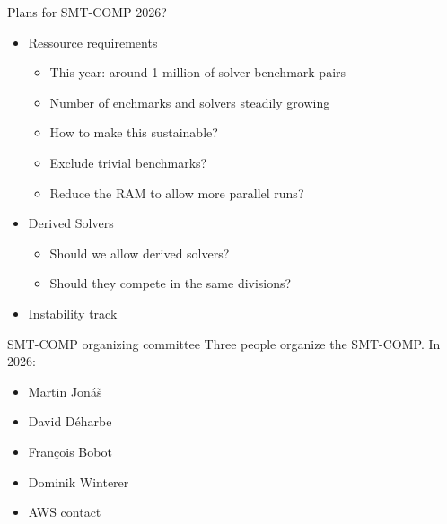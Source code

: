 \documentclass[table]{beamer}
\def\emph#1{\textcolor{MYblue}{#1}}
\newcommand\vitem{\vfill\item}
\begin{document}
\begin{frame}{Plans for SMT-COMP 2026?}
  \begin{itemize}
    \item Ressource requirements 
        \begin{itemize}
            \item This year: around 1 million of solver-benchmark pairs 
            \item Number of enchmarks and solvers steadily growing 
            \item How to make this sustainable? 
            \item Exclude \emph{trivial benchmarks}?
            \item Reduce the RAM to allow more parallel runs?
        \end{itemize} 
    \item Derived Solvers
        \begin{itemize}
            \item Should we allow derived solvers?
            \item Should they compete in the same divisions?
        \end{itemize}
    \item Instability track 


  \end{itemize}


\end{frame}

\begin{frame}{SMT-COMP organizing committee}
  Three people organize the SMT-COMP.  In 2026:
  \begin{itemize}
  \item Martin Jonáš
  \item David Déharbe 
  \item Fran\c{c}ois Bobot
  \item Dominik Winterer 
  \item AWS contact   
  \end{itemize}
  \bigskip
\end{frame}
\end{document}
